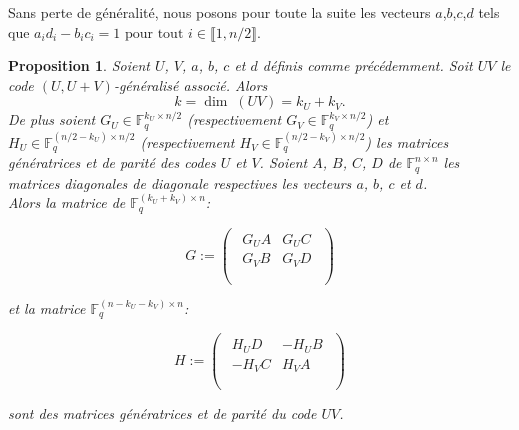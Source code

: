 \documentclass[12pt]{article}
\theoremstyle{plain}
\newtheorem{propo}[thm]{Proposition}
\newcommand{\F}{\mathbb{F}}
\begin{document}
\noindent Sans perte de généralité, nous posons pour toute la suite les vecteurs $a$,$b$,$c$,$d$ tels que $a_id_i - b_ic_i = 1 \text{ pour tout } i \in \llbracket 1,n/2\rrbracket$. \\

\begin{propo} Soient $U$, $V$, $a$, $b$, $c$ et $d$ définis comme précédemment. Soit $UV$ le code $(U,U+V)$-généralisé associé. Alors
$$ k = \dim\; (UV) = k_U + k_V.$$
De plus soient $G_U \in \F_q^{k_U \times n/2}$ (respectivement $G_V \in \F_q^{k_V \times n/2}$) et $H_U \in \F_q^{(n/2-k_U) \times n/2}$ (respectivement $H_V \in \F_q^{(n/2-k_V) \times n/2}$) les matrices génératrices et de parité des codes $U$ et $V$. Soient $A$, $B$, $C$, $D$ de $\F_q^{n \times n}$ les matrices diagonales de diagonale respectives les vecteurs $a$, $b$, $c$ et $d$.  \\
\vspace{0.2in}
Alors la matrice de $\F_q^{(k_U + k_V) \times n}$: 

\vspace{0.1in}

$$
G := 
\begin{pmatrix}
\begin{array}{c|c}
G_UA & G_UC \\
 \hline 
G_VB & G_VD \\
\end{array} \\
\end{pmatrix}
$$

\noindent et la matrice $\F_q^{(n - k_U - k_V) \times n}$:

\vspace{0.1in}
$$ 
H :=
\begin{pmatrix}
\begin{array}{c|c}
H_UD & -H_UB \\
 \hline 
-H_VC & H_VA \\
\end{array} \\
\end{pmatrix}
$$
\vspace{0.1in}

\noindent sont des matrices génératrices et de parité du code $UV$. 
\end{propo}
\end{document}
